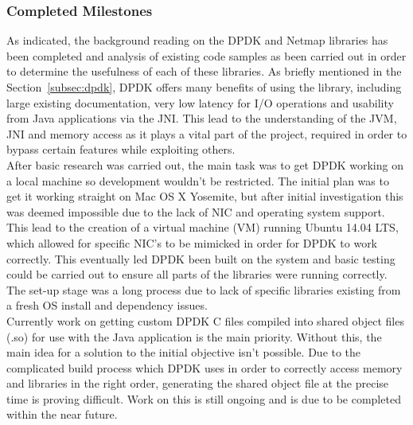 \documentclass[interim_report.tex]{subfiles}
\begin{document}
\subsubsection{Completed Milestones}
As indicated, the background reading on the DPDK and Netmap libraries has been completed and analysis of existing code samples as been carried out in order to determine the usefulness of each of these libraries. As briefly mentioned in the Section~\ref{subsec:dpdk}, DPDK offers many benefits of using the library, including large existing documentation, very low latency for I/O operations and usability from Java applications via the JNI. This lead to the understanding of the JVM, JNI and memory access as it plays a vital part of the project, required in order to bypass certain features while exploiting others. \\
\newline
After basic research was carried out, the main task was to get DPDK working on a local machine so development wouldn't be restricted. The initial plan was to get it working straight on Mac OS X Yosemite, but after initial investigation this was deemed impossible due to the lack of NIC and operating system support. This lead to the creation of a virtual machine (VM) running Ubuntu 14.04 LTS, which allowed for specific NIC's to be mimicked in order for DPDK to work correctly. This eventually led DPDK been built on the system and basic testing could be carried out to ensure all parts of the libraries were running correctly. The set-up stage was a long process due to lack of specific libraries existing from a fresh OS install and dependency issues. \\
\newline
Currently work on getting custom DPDK C files compiled into shared object files (.so) for use with the Java application is the main priority. Without this, the main idea for a solution to the initial objective isn't possible. Due to the complicated build process which DPDK uses in order to correctly access memory and libraries in the right order, generating the shared object file at the precise time is proving difficult. Work on this is still ongoing and is due to be completed within the near future.
\end{document}
